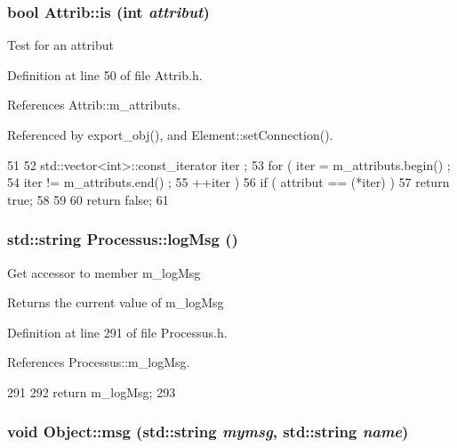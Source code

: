 \hypertarget{classAttrib_a704f26af560909ad22065083bb7d4c34}{
\subsubsection[{is}]{\setlength{\rightskip}{0pt plus 5cm}bool Attrib::is (int {\em attribut})}}
\label{classAttrib_a704f26af560909ad22065083bb7d4c34}
Test for an attribut 

Definition at line 50 of file Attrib.h.

References Attrib::m\_\-attributs.

Referenced by export\_\-obj(), and Element::setConnection().


\begin{DoxyCode}
51   {
52     std::vector<int>::const_iterator iter ;
53     for ( iter  = m_attributs.begin() ;
54           iter != m_attributs.end()   ;
55           ++iter ) {
56       if ( attribut == (*iter) ) {
57         return true;
58       }
59     }
60     return false;
61   }
\end{DoxyCode}
\hypertarget{classProcessus_a42fdeb17dc13ba854222666b6aa29b61}{
\subsubsection[{logMsg}]{\setlength{\rightskip}{0pt plus 5cm}std::string Processus::logMsg ()}}
\label{classProcessus_a42fdeb17dc13ba854222666b6aa29b61}
Get accessor to member m\_\-logMsg \begin{DoxyReturn}{Returns}
the current value of m\_\-logMsg 
\end{DoxyReturn}


Definition at line 291 of file Processus.h.

References Processus::m\_\-logMsg.


\begin{DoxyCode}
291                       {
292     return m_logMsg;
293   }
\end{DoxyCode}
\hypertarget{classObject_ac5d59299273cee27aacf7de00d2e7034}{
\subsubsection[{msg}]{\setlength{\rightskip}{0pt plus 5cm}void Object::msg (std::string {\em mymsg}, \/  std::string {\em name})}}
\label{classObject_ac5d59299273cee27aacf7de00d2e7034}


